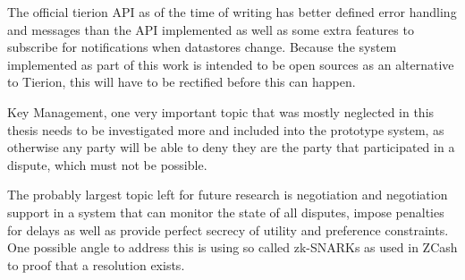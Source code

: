 \documentclass[12pt,msc,a4paper,oneside]{ucl_thesis}
\begin{document}
The official tierion API as of the time of writing has better defined error handling and messages than the API implemented as well as some extra features to subscribe for notifications when datastores change. Because the system implemented as part of this work is intended to be open sources as an alternative to Tierion, this will have to be rectified before this can happen.

Key Management, one very important topic that was mostly neglected in this thesis needs to be investigated more and included into the prototype system, as otherwise any party will be able to deny they are the party that participated in a dispute, which must not be possible.

The probably largest topic left for future research is negotiation and negotiation support in a system that can monitor the state of all disputes, impose penalties for delays as well as provide perfect secrecy of utility and preference constraints. One possible angle to address this is using so called zk-SNARKs as used in ZCash to proof that a resolution exists. 



\end{document}
